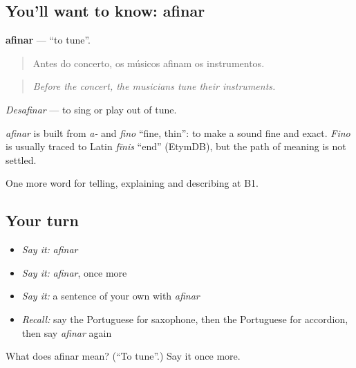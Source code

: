 \subsection*{You'll want to know: afinar}
\textbf{afinar} — \textquotedblleft{}to tune\textquotedblright{}.

\begin{quote}
Antes do concerto, os músicos afinam os instrumentos.
\end{quote}

\begin{quote}
\emph{Before the concert, the musicians tune their instruments.}
\end{quote}

\emph{Desafinar} — to sing or play out of tune.

\begin{cousinweb}
\emph{afinar} is built from \emph{a-} and \emph{fino} \textquotedblleft{}fine, thin\textquotedblright{}: to make a sound fine and exact. \emph{Fino} is usually traced to Latin \emph{fīnis} \textquotedblleft{}end\textquotedblright{} (EtymDB), but the path of meaning is not settled.
\end{cousinweb}

\begin{grammarlens}[title={What you've built}]
One more word for telling, explaining and describing at B1.
\end{grammarlens}

\subsection*{Your turn}
\begin{itemize}
\raggedright
  \item \emph{Say it:} \emph{afinar}
  \item \emph{Say it:} \emph{afinar}, once more
  \item \emph{Say it:} a sentence of your own with \emph{afinar}
  \item \emph{Recall:} say the Portuguese for saxophone, then the Portuguese for accordion, then say \emph{afinar} again
\end{itemize}

\begin{tcolorbox}[breakable,colback=teal!4,colframe=teal!35!black,title={Before you move on}]
What does afinar mean? (\textquotedblleft{}To tune\textquotedblright{}.) Say it once more.
\end{tcolorbox}

